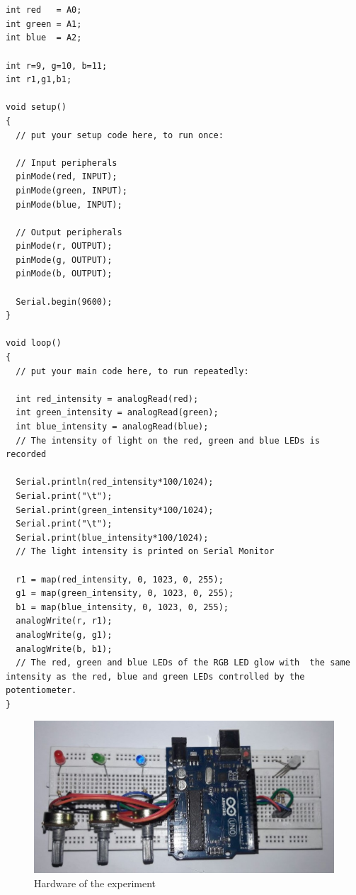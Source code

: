 \begin{lstlisting}[language=Arduino, numbers=none, caption={Arduino code for measuring and calibrating the intensity of light in the LEDs}, captionpos=b, label={lst:rgb}]


int red   = A0;
int green = A1;
int blue  = A2;

int r=9, g=10, b=11;
int r1,g1,b1;

void setup() 
{
  // put your setup code here, to run once:
  
  // Input peripherals
  pinMode(red, INPUT);  
  pinMode(green, INPUT);  
  pinMode(blue, INPUT); 
  
  // Output peripherals
  pinMode(r, OUTPUT);  
  pinMode(g, OUTPUT);
  pinMode(b, OUTPUT);  
  
  Serial.begin(9600);
}

void loop() 
{
  // put your main code here, to run repeatedly:
  
  int red_intensity = analogRead(red);  
  int green_intensity = analogRead(green); 
  int blue_intensity = analogRead(blue); 
  // The intensity of light on the red, green and blue LEDs is recorded
  
  Serial.println(red_intensity*100/1024);   
  Serial.print("\t");
  Serial.print(green_intensity*100/1024);  
  Serial.print("\t");
  Serial.print(blue_intensity*100/1024);  
  // The light intensity is printed on Serial Monitor

  r1 = map(red_intensity, 0, 1023, 0, 255);
  g1 = map(green_intensity, 0, 1023, 0, 255);
  b1 = map(blue_intensity, 0, 1023, 0, 255);
  analogWrite(r, r1);
  analogWrite(g, g1);
  analogWrite(b, b1);
  // The red, green and blue LEDs of the RGB LED glow with  the same intensity as the red, blue and green LEDs controlled by the potentiometer.
}

\end{lstlisting}

\begin{figure}[H]
    \centering
    \includegraphics[scale = 0.5]{Figures/formation-of-colors.jpg}
    \caption{Hardware of the experiment}
\end{figure}

